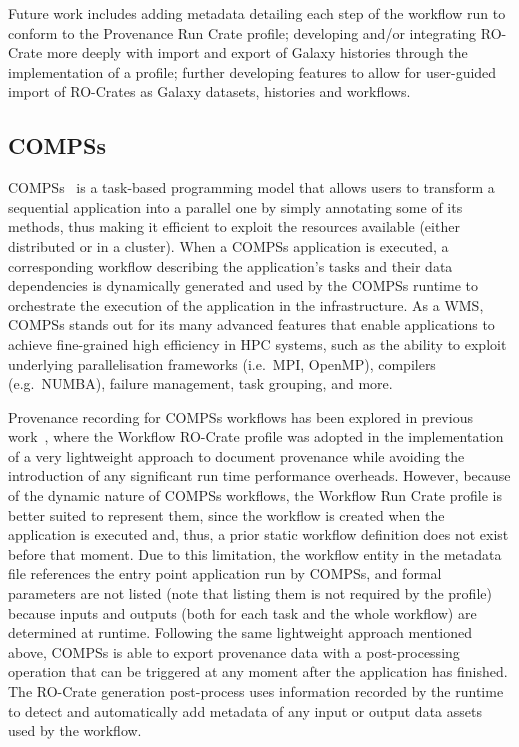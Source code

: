 \documentclass[10pt,letterpaper]{article}
\begin{document}
Future work includes adding metadata detailing each step of the workflow run to conform to the Provenance Run Crate profile; developing and/or integrating RO-Crate more deeply with import and export of Galaxy histories through the implementation of a profile; further developing features to allow for user-guided import of RO-Crates as Galaxy datasets, histories and workflows.

\subsection{COMPSs}\label{compss}

COMPSs~\cite{Lordan 2014} is a task-based programming model that allows users to transform a sequential application into a parallel one by simply annotating some of its methods, thus making it efficient to exploit the resources available (either distributed or in a cluster).
When a COMPSs application is executed, a corresponding workflow describing the application's tasks and their data dependencies is dynamically generated and used by the COMPSs runtime to orchestrate the execution of the application in the infrastructure.
As a WMS, COMPSs stands out for its many advanced features that enable applications to achieve fine-grained high efficiency in HPC systems, such as the ability to exploit underlying parallelisation frameworks (i.e.~MPI, OpenMP), compilers (e.g.~NUMBA), failure management, task grouping, and more.

Provenance recording for COMPSs workflows has been explored in previous work~\cite{Sirvent 2022}, where the Workflow RO-Crate profile was adopted in the implementation of a very lightweight approach to document provenance while avoiding the introduction of any significant run time performance overheads.
However, because of the dynamic nature of COMPSs workflows, the Workflow Run Crate profile is better suited to represent them, since the workflow is created when the application is executed and, thus, a prior static workflow definition does not exist before that moment.
Due to this limitation, the workflow entity in the metadata file references the entry point application run by COMPSs, and formal parameters are not listed (note that listing them is not required by the profile) because inputs and outputs (both for each task and the whole workflow) are determined at runtime.
Following the same lightweight approach mentioned above, COMPSs is able to export provenance data with a post-processing operation that can be triggered at any moment after the application has finished.
The RO-Crate generation post-process uses information recorded by the runtime to detect and automatically add metadata of any input or output data assets used by the workflow.
\end{document}
